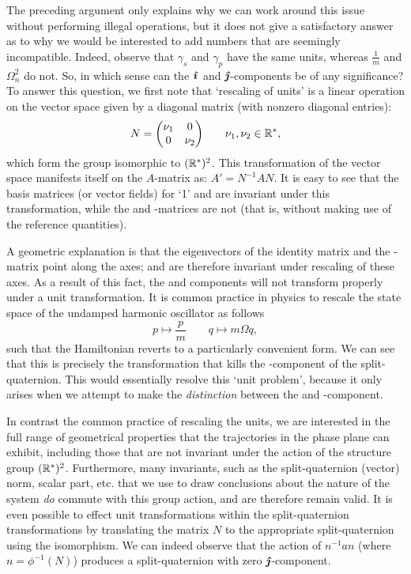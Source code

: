 The preceding argument only explains why we can work around this issue without performing illegal operations, but it does not give a satisfactory answer as to why we would be interested to add numbers that are seemingly incompatible. Indeed, observe that \(\gamma_s\) and \(\gamma_p\) have the same units, whereas \(\tfrac{1}{m}\) and \(\Omega_n^2\) do not. So, in which sense can the \(\quati\) and \(\quatj\)-components be of any significance? To answer this question, we first note that `rescaling of units' is a linear operation on the vector space given by a diagonal matrix (with nonzero diagonal entries): 
\begin{equation}
     N = \mqty(\dmat[0]{\nu_1}{\nu_2}) \qquad \nu_1, \nu_2 \in \real^*,
\end{equation}
which form the group isomorphic to \((\real^*)^2\). This transformation of the vector space manifests itself on the \(A\)-matrix as: \( A' = N^{-1}A N\). It is easy to see that the basis matrices (or vector fields) for `1' and \quatk are invariant under this transformation, while the \quati and \quatj-matrices are not (that is, without making use of the reference quantities). 

A geometric explanation is that the eigenvectors of the identity matrix and the \quatk-matrix point along the axes; and are therefore invariant under rescaling of these axes. As a result of this fact, the \quati and \quatj components will not transform properly under a unit transformation. It is common practice in physics to rescale the state space of the undamped harmonic oscillator as follows \cite{Dekker1981,Dedene1980}
\begin{equation}
     p \mapsto \frac{p}{m} \qquad q \mapsto m\Omega q,
\end{equation}
such that the Hamiltonian reverts to a particularly convenient form. We can see that this is precisely the transformation that kills the \quatj-component of the split-quaternion. This would essentially resolve this `unit problem', because it only arises when we attempt to make the \emph{distinction} between the \quati and \quatj-component.

In contrast the common practice of rescaling the units, we are interested in the full range of geometrical properties that the trajectories in the phase plane can exhibit, including those that are not invariant under the action of the structure group \((\real^*)^2\). Furthermore, many invariants, such as the split-quaternion (vector) norm, scalar part, etc. that we use to draw conclusions about the nature of the system \emph{do} commute with this group action, and are therefore remain valid. It is even possible to effect unit transformations within the split-quaternion transformations by translating the matrix \(N\) to the appropriate split-quaternion using the isomorphism. We can indeed observe that the action of \(n^{-1} a n\) (where \(n = \phi^{-1}(N)\)) produces a split-quaternion with zero \(\quatj\)-component. 


